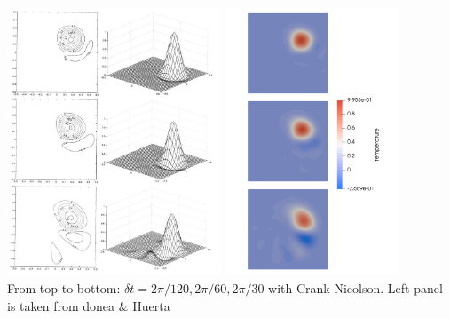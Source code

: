 \begin{center}
\includegraphics[height=8cm]{python_codes/fieldstone_43/images/dohu03}
\includegraphics[height=8cm]{python_codes/fieldstone_43/images/temps_30_60_120}\\
{\small From top to bottom: $\delta t=2\pi/120,2\pi/60,2\pi/30$ with Crank-Nicolson. Left panel is taken from donea \& Huerta \cite{dohu03}}
\end{center}

